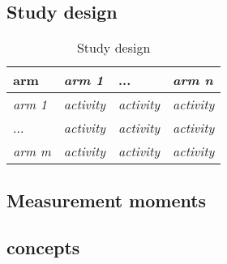 \documentclass[a4paper,10pt]{article}
\begin{document}
\subsection*{Study design}
\begin{table}[h]
  \centering
  \label{table:Study design}
  \caption{Study design}
  \begin{tabular}{|l|l|l|l|}
    \hline
    \textbf{arm}   & \textit{arm 1}    & ...               & \textit{arm n}    \\ \hline
    \textit{arm 1} & \textit{activity} & \textit{activity} & \textit{activity} \\ \hline
    ...            & \textit{activity} & \textit{activity} & \textit{activity} \\ \hline
    \textit{arm m} & \textit{activity} & \textit{activity} & \textit{activity} \\ \hline
  \end{tabular}
\end{table}

\subsection*{Measurement moments}
\subsection*{concepts}
\end{document}
